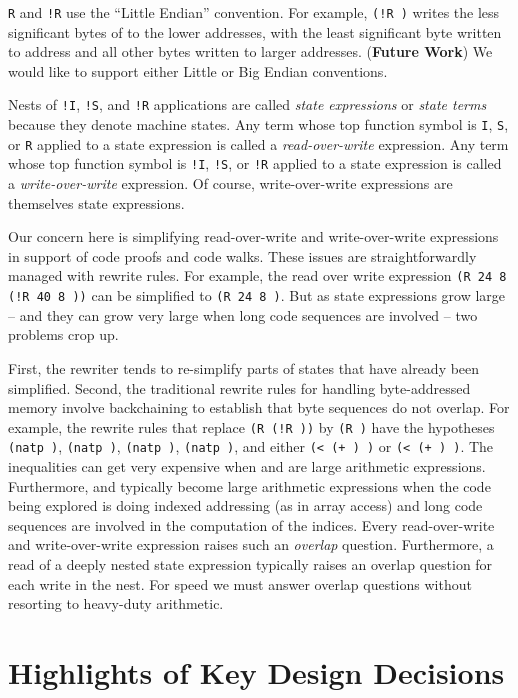 \documentclass[submission,copyright,creativecommons]{eptcs}
\newcommand{\ptt}[1]{\tt{#1}}
\begin{document}
{\ptt{R}} and {\ptt{!R}} use the ``Little Endian'' convention.  For example,
{\ptt{(!R    )}} writes the less significant bytes of  to the lower
addresses, with the least significant byte written to address  and all
other bytes written to larger addresses.  ({\bf{Future Work}}) We would like
to support either Little or Big Endian conventions.

Nests of {\ptt{!I}}, {\ptt{!S}}, and {\ptt{!R}} applications are called
{\em{state expressions}} or {\em{state terms}} because they denote machine
states.  Any term whose top function symbol is {\ptt{I}}, {\ptt{S}}, or
{\ptt{R}} applied to a state expression is called a {\em{read-over-write}}
expression.  Any term whose top function symbol is {\ptt{!I}}, {\ptt{!S}}, or
{\ptt{!R}} applied to a state expression is called a {\em{write-over-write}}
expression.  Of course, write-over-write expressions are themselves state
expressions.  

Our concern here is simplifying read-over-write and write-over-write
expressions in support of code proofs and code walks.  These issues are
straightforwardly managed with rewrite rules.  For example, the read over
write expression {\ptt{(R 24 8 (!R 40 8  ))}} can be simplified to
{\ptt{(R 24 8 )}}. But as state expressions grow large -- and they
can grow very large when long code sequences are involved -- two problems
crop up.

First, the rewriter tends to re-simplify parts of states that have already
been simplified.  Second, the traditional rewrite rules for handling byte-addressed memory
involve backchaining to establish that byte sequences do not overlap.  For
example, the rewrite rules that replace {\ptt{(R   (!R   
    ))}} by {\ptt{(R   )}} have the hypotheses {\ptt{(natp
    )}}, {\ptt{(natp )}}, {\ptt{(natp )}}, {\ptt{(natp )}}, and
either {\ptt{(< (+  ) )}} or {\ptt{(< (+  ) )}}.  The
inequalities can get very expensive when  and  are large arithmetic
expressions.  Furthermore,  and  typically become large arithmetic
expressions when the code being explored is doing indexed addressing (as in
array access) and long code sequences are involved in the computation of the
indices.  Every read-over-write and write-over-write expression raises such
an {\em{overlap}} question.  Furthermore, a read of a deeply nested state
expression typically raises an overlap question for each write in the nest.
For speed we must answer overlap questions without resorting to heavy-duty arithmetic.

\section{Highlights of Key Design Decisions}
\end{document}
